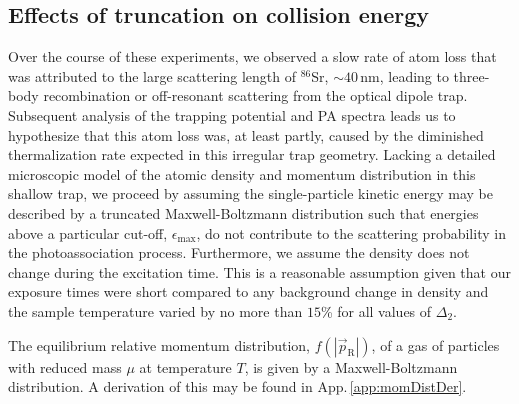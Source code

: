 \subsection{Effects of truncation on collision energy} \label{sec:trunc_trap}
Over the course of these experiments, we observed a slow rate of atom loss that was attributed to the large scattering length of $^{86}$Sr, $\sim40$\,nm, leading to three-body recombination or off-resonant scattering from the optical dipole trap.
Subsequent analysis of the trapping potential and PA spectra leads us to hypothesize that this atom loss was, at least partly, caused by the diminished thermalization rate expected in this irregular trap geometry.
Lacking a detailed microscopic model of the atomic density and momentum distribution in this shallow trap, we proceed by assuming the single-particle kinetic energy may be described by a truncated Maxwell-Boltzmann distribution such that energies above a particular cut-off, $\epsilon_\text{max}$, do not contribute to the scattering probability in the photoassociation process.
Furthermore, we assume the density does not change during the excitation time.
This is a reasonable assumption given that our exposure times were short compared to any background change in density and the sample temperature varied by no more than $15$\% for all values of $\Delta_2$.


The equilibrium relative momentum distribution, $f(|\vec{p}_\text{R}|)$, of a gas of particles with reduced mass $\mu$ at temperature $T$, is given by a Maxwell-Boltzmann distribution.
A derivation of this may be found in App.\,\ref{app:momDistDer}.

